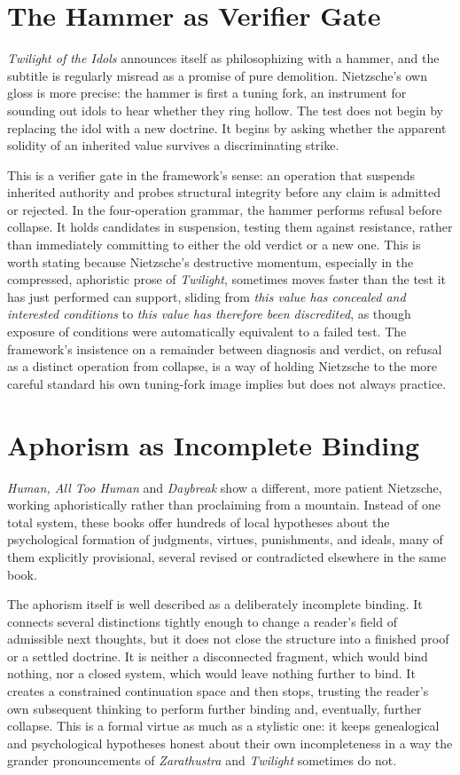 \documentclass[11pt]{article}
\begin{document}
\section*{The Hammer as Verifier Gate}

\emph{Twilight of the Idols} announces itself as philosophizing with a hammer, and the subtitle is regularly misread as a promise of pure demolition. Nietzsche's own gloss is more precise: the hammer is first a tuning fork, an instrument for sounding out idols to hear whether they ring hollow. The test does not begin by replacing the idol with a new doctrine. It begins by asking whether the apparent solidity of an inherited value survives a discriminating strike.

This is a verifier gate in the framework's sense: an operation that suspends inherited authority and probes structural integrity before any claim is admitted or rejected. In the four-operation grammar, the hammer performs refusal before collapse. It holds candidates in suspension, testing them against resistance, rather than immediately committing to either the old verdict or a new one. This is worth stating because Nietzsche's destructive momentum, especially in the compressed, aphoristic prose of \emph{Twilight}, sometimes moves faster than the test it has just performed can support, sliding from \emph{this value has concealed and interested conditions} to \emph{this value has therefore been discredited}, as though exposure of conditions were automatically equivalent to a failed test. The framework's insistence on a remainder between diagnosis and verdict, on refusal as a distinct operation from collapse, is a way of holding Nietzsche to the more careful standard his own tuning-fork image implies but does not always practice.

\section*{Aphorism as Incomplete Binding}

\emph{Human, All Too Human} and \emph{Daybreak} show a different, more patient Nietzsche, working aphoristically rather than proclaiming from a mountain. Instead of one total system, these books offer hundreds of local hypotheses about the psychological formation of judgments, virtues, punishments, and ideals, many of them explicitly provisional, several revised or contradicted elsewhere in the same book.

The aphorism itself is well described as a deliberately incomplete binding. It connects several distinctions tightly enough to change a reader's field of admissible next thoughts, but it does not close the structure into a finished proof or a settled doctrine. It is neither a disconnected fragment, which would bind nothing, nor a closed system, which would leave nothing further to bind. It creates a constrained continuation space and then stops, trusting the reader's own subsequent thinking to perform further binding and, eventually, further collapse. This is a formal virtue as much as a stylistic one: it keeps genealogical and psychological hypotheses honest about their own incompleteness in a way the grander pronouncements of \emph{Zarathustra} and \emph{Twilight} sometimes do not.
\end{document}
